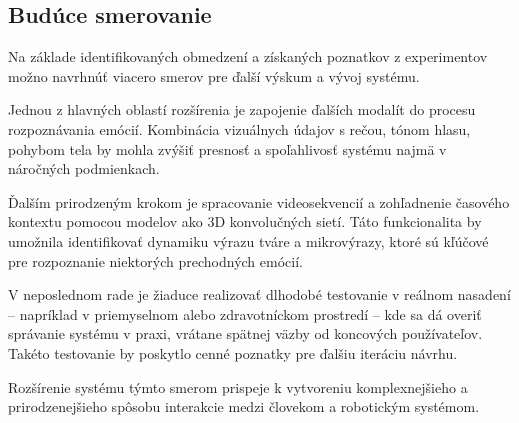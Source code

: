 \subsection{Budúce smerovanie}

Na základe identifikovaných obmedzení a získaných poznatkov z experimentov možno navrhnúť viacero smerov pre ďalší výskum a vývoj systému.

Jednou z hlavných oblastí rozšírenia je zapojenie ďalších modalít do procesu rozpoznávania emócií. Kombinácia vizuálnych údajov s rečou, tónom hlasu, pohybom tela by mohla zvýšiť presnosť a spoľahlivosť systému najmä v náročných podmienkach.

Ďalším prirodzeným krokom je spracovanie videosekvencií a zohľadnenie časového kontextu pomocou modelov ako 3D konvolučných sietí. Táto funkcionalita by umožnila identifikovať dynamiku výrazu tváre a mikrovýrazy, ktoré sú kľúčové pre rozpoznanie niektorých prechodných emócií.

V neposlednom rade je žiaduce realizovať dlhodobé testovanie v reálnom nasadení – napríklad v priemyselnom alebo zdravotníckom prostredí – kde sa dá overiť správanie systému v praxi, vrátane spätnej väzby od koncových používateľov. Takéto testovanie by poskytlo cenné poznatky pre ďalšiu iteráciu návrhu.

Rozšírenie systému týmto smerom prispeje k vytvoreniu komplexnejšieho a prirodzenejšieho spôsobu interakcie medzi človekom a robotickým systémom.
